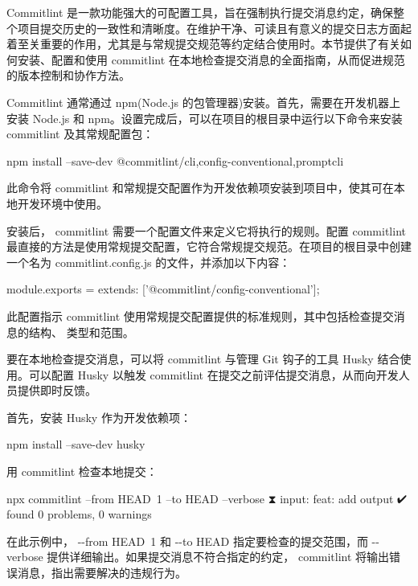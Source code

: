 
Commitlint 是一款功能强大的可配置工具，旨在强制执行提交消息约定，确保整个项目提交历史的一致性和清晰度。在维护干净、可读且有意义的提交日志方面起着至关重要的作用，尤其是与常规提交规范等约定结合使用时。本节提供了有关如何安装、配置和使用 commitlint 在本地检查提交消息的全面指南，从而促进规范的版本控制和协作方法。


Commitlint 通常通过 npm(Node.js 的包管理器)安装。首先，需要在开发机器上安装 Node.js 和 npm。设置完成后，可以在项目的根目录中运行以下命令来安装 commitlint 及其常规配置包：

\begin{shell}
npm install --save-dev @commitlint/{cli,config-conventional,promptcli}
\end{shell}

此命令将 commitlint 和常规提交配置作为开发依赖项安装到项目中，使其可在本地开发环境中使用。


安装后， commitlint 需要一个配置文件来定义它将执行的规则。配置 commitlint 最直接的方法是使用常规提交配置，它符合常规提交规范。在项目的根目录中创建一个名为 commitlint.config.js 的文件，并添加以下内容：

\begin{shell}
module.exports = {extends: ['@commitlint/config-conventional']};
\end{shell}

此配置指示 commitlint 使用常规提交配置提供的标准规则，其中包括检查提交消息的结构、 类型和范围。


要在本地检查提交消息，可以将 commitlint 与管理 Git 钩子的工具 Husky 结合使用。可以配置 Husky 以触发 commitlint 在提交之前评估提交消息，从而向开发人员提供即时反馈。

首先，安装 Husky 作为开发依赖项：

\begin{shell}
npm install --save-dev husky
\end{shell}

用 commitlint 检查本地提交：

\begin{shell}
npx commitlint --from HEAD~1 --to HEAD --verbose
⧗ input: feat: add output
✔ found 0 problems, 0 warnings
\end{shell}

在此示例中， -{}-from HEAD~1 和 -{}-to HEAD 指定要检查的提交范围，而 -{}-verbose 提供详细输出。如果提交消息不符合指定的约定， commitlint 将输出错误消息，指出需要解决的违规行为。

